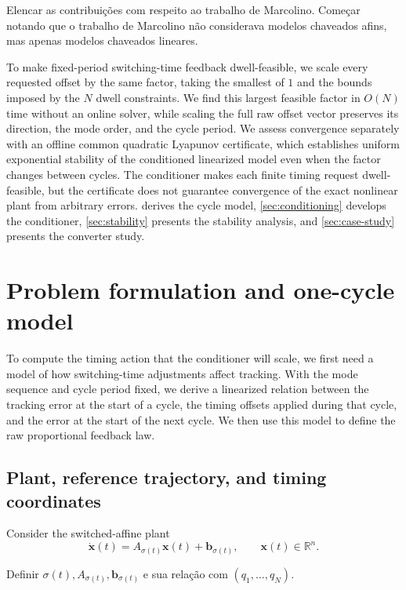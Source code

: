 \documentclass[pdflatex,iicol,sn-mathphys-ay]{sn-jnl}
\newcommand{\R}{\mathbb{R}}
\newcommand{\vect}[1]{\bm{#1}}
\newcommand{\red}[1]{{\color{red}#1}}
\begin{document}
\red{Elencar as contribuições com respeito ao trabalho de Marcolino. Começar notando que o trabalho de Marcolino não considerava modelos chaveados afins, mas apenas modelos chaveados lineares.}

To make fixed-period switching-time feedback dwell-feasible, we scale every requested offset by the same factor, taking the smallest of $1$ and the bounds imposed by the $N$ dwell constraints. We find this largest feasible factor in $O(N)$ time without an online solver, while scaling the full raw offset vector preserves its direction, the mode order, and the cycle period. We assess convergence separately with an offline common quadratic Lyapunov certificate, which establishes uniform exponential stability of the conditioned linearized model even when the factor changes between cycles. The conditioner makes each finite timing request dwell-feasible, but the certificate does not guarantee convergence of the exact nonlinear plant from arbitrary errors.  derives the cycle model, \cref{sec:conditioning} develops the conditioner, \cref{sec:stability} presents the stability analysis, and \cref{sec:case-study} presents the converter study.

\section{Problem formulation and one-cycle model}
\label{sec:model}

To compute the timing action that the conditioner will scale, we first need a model of how switching-time adjustments affect tracking. With the mode sequence and cycle period fixed, we derive a linearized relation between the tracking error at the start of a cycle, the timing offsets applied during that cycle, and the error at the start of the next cycle. We then use this model to define the raw proportional feedback law.

\subsection{Plant, reference trajectory, and timing coordinates}

Consider the switched-affine plant
\begin{equation}
    \dot{\vect{x}}(t)=A_{\sigma(t)}\vect{x}(t)+\vect{b}_{\sigma(t)},
    \qquad \vect{x}(t)\in\R^n.
    \label{eq:plant}
\end{equation}

\red{Definir $\sigma(t), A_{\sigma(t)}, \vect{b}_{\sigma(t)}$ e sua relação com $(q_1,\ldots,q_N)$}.
\end{document}
